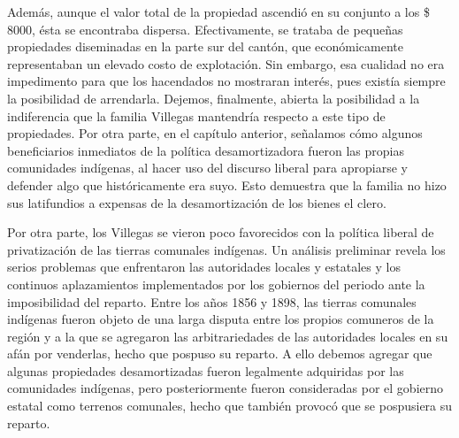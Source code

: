 \documentclass[14pt,twoside,final]{extbook} %
\begin{document}
Además, aunque el valor total de la propiedad ascendió en su conjunto a los \$\,8000, ésta se encontraba dispersa. Efectivamente, se trataba de pequeñas propiedades diseminadas en la parte sur del cantón, que económicamente representaban un elevado costo de explotación. Sin embargo, esa cualidad no era impedimento para que los hacendados no mostraran interés, pues existía siempre la posibilidad de arrendarla. Dejemos, finalmente, abierta la posibilidad a la indiferencia que la familia Villegas mantendría respecto a este tipo de propiedades. Por otra parte, en el capítulo anterior, señalamos cómo algunos beneficiarios inmediatos de la política desamortizadora fueron las propias comunidades indígenas, al hacer uso del discurso liberal para apropiarse y defender algo que históricamente era suyo. Esto demuestra que la familia no hizo sus latifundios a expensas de la desamortización de los bienes el clero.

Por otra parte, los Villegas se vieron poco favorecidos con la política liberal de privatización de las tierras comunales indígenas. Un análisis preliminar revela los serios problemas que enfrentaron las autoridades locales y estatales y los continuos aplazamientos implementados por los gobiernos del periodo ante la imposibilidad del reparto. Entre los años 1856 y 1898, las tierras comunales indígenas fueron objeto de una larga disputa entre los propios comuneros de la región y a la que se agregaron las arbitrariedades de las autoridades locales en su afán por venderlas, hecho que pospuso su reparto. A ello debemos agregar que algunas propiedades desamortizadas fueron legalmente adquiridas por las comunidades indígenas, pero posteriormente fueron consideradas por el gobierno estatal como terrenos comunales, hecho que también provocó que se pospusiera su reparto. \enlargethispage{\baselineskip}
\end{document}
